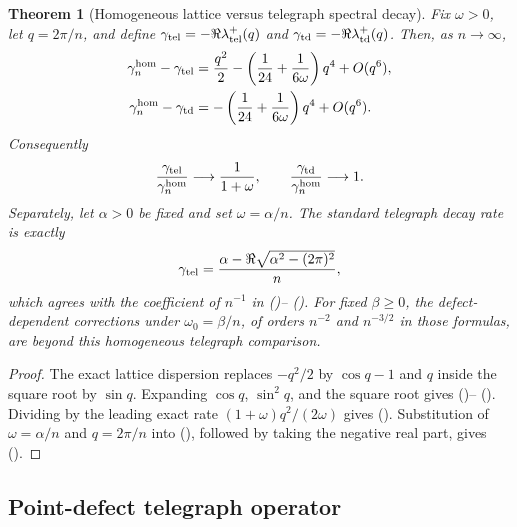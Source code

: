 \documentclass[twoside,10pt]{article}
\numberwithin{equation}{section}
\theoremstyle{slbody}
\newtheorem{theorem}{Theorem}[section]
\theoremstyle{definition}
\theoremstyle{remark}
\renewcommand{\eqref}[1]{%
  \textup{{\normalfont(\oldstylenums{\ref{#1}}}\normalfont)}}
\begin{document}
\begin{theorem}[Homogeneous lattice versus telegraph spectral decay]
\label{thm:telegraph-comparison}
Fix $\omega>0$, let $q=2\pi/n$, and define
$\gamma_{\rm tel}=-\Re\lambda_{\rm tel}^+(q)$ and
$\gamma_{\rm td}=-\Re\lambda_{\rm td}^+(q)$.  Then, as $n\to\infty$,
\begin{align}
 \gamma_n^{\rm hom}-\gamma_{\rm tel}
 &=\frac{q^2}{2}
   -\left(\frac1{24}+\frac1{6\omega}\right)q^4+O(q^6),
   \label{eq:telegraph-error}\\
 \gamma_n^{\rm hom}-\gamma_{\rm td}
 &=-\left(\frac1{24}+\frac1{6\omega}\right)q^4+O(q^6).
   \label{eq:corrected-telegraph-error}
\end{align}
Consequently
\begin{equation}\label{eq:telegraph-ratios}
 \frac{\gamma_{\rm tel}}{\gamma_n^{\rm hom}}
 \longrightarrow\frac1{1+\omega},
 \qquad
 \frac{\gamma_{\rm td}}{\gamma_n^{\rm hom}}\longrightarrow1.
\end{equation}
Separately, let $\alpha>0$ be fixed and set $\omega=\alpha/n$.  The
standard telegraph decay rate is exactly
\begin{equation}\label{eq:telegraph-critical}
 \gamma_{\rm tel}
 =\frac{\alpha-\Re\sqrt{\alpha^2-(2\pi)^2}}{n},
\end{equation}
which agrees with the coefficient of $n^{-1}$ in
\eqref{eq:critical-below}--\eqref{eq:critical-at-fast}.  For fixed
$\beta\ge0$, the defect-dependent corrections under
$\omega_0=\beta/n$, of orders $n^{-2}$ and $n^{-3/2}$ in those formulas,
are beyond this homogeneous telegraph comparison.
\end{theorem}

\begin{proof}
The exact lattice dispersion replaces $-q^2/2$ by $\cos q-1$ and $q$
inside the square root by $\sin q$.  Expanding
$\cos q$, $\sin^2q$, and the square root gives
\eqref{eq:telegraph-error}--\eqref{eq:corrected-telegraph-error}.
Dividing by the leading exact rate $(1+\omega)q^2/(2\omega)$ gives
\eqref{eq:telegraph-ratios}.  Substitution of $\omega=\alpha/n$ and
$q=2\pi/n$ into \eqref{eq:telegraph-eigenvalue}, followed by taking
the negative real part, gives \eqref{eq:telegraph-critical}.
\end{proof}

\subsection{Point-defect telegraph operator}
\end{document}
